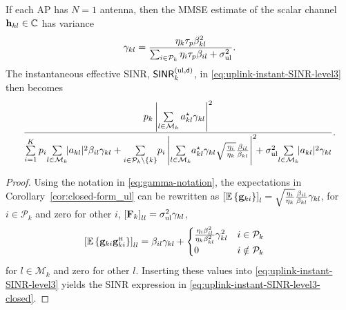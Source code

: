 	\begin{corollary}
	If each AP has $N=1$ antenna, then the MMSE estimate of the scalar channel $\mathbf{h}_{kl} \in \mathbb{C}$ has variance
	\begin{equation} \label{eq:gamma-notation}
	 \gamma_{kl} = \frac{\eta_k \tau_p \beta_{kl}^2 }{ \sum_{i \in \mathcal{P}_k } \eta_i \tau_p \beta_{il} +\sigma^2_{\mathrm{ul}} }.
	 \end{equation}
	The instantaneous effective SINR, $\mathsf{SINR}_{k}^{({\rm ul},\mathsf{d})}$, in \eqref{eq:uplink-instant-SINR-level3} then becomes
		\begin{equation} \label{eq:uplink-instant-SINR-level3-closed}
 \frac{ p_{k} \left| 
\sum\limits_{l \in \mathcal{M}_k} a_{kl}^{\star} \gamma_{kl} \right|^2  }{ 
 \sum\limits_{i=1}^{K} p_{i}  \! \sum\limits_{l \in \mathcal{M}_k}\! \! |a_{kl}|^2 \beta_{il} \gamma_{kl} + \sum\limits_{i \in \mathcal{P}_k \setminus \{ k \}} \! p_i
\left| \sum\limits_{l \in \mathcal{M}_k} \! a_{kl}^{\star} \gamma_{kl} \sqrt{\frac{\eta_i}{\eta_k}} \frac{\beta_{il}}{\beta_{kl}}  \right|^2 \!\!
+ \sigmaUL \!\sum\limits_{l \in \mathcal{M}_k} \!\!  |a_{kl}|^2 \gamma_{kl}
	}.
	\end{equation}
	\end{corollary}
	\begin{proof}
	Using the notation in \eqref{eq:gamma-notation}, the expectations in Corollary~\ref{cor:closed-form_ul} can be rewritten as $\left[\mathbb{E} \left\{\mathbf{g}_{ki}\right\} \right ]_l = \sqrt{\frac{\eta_i}{\eta_k}} \frac{\beta_{il}}{\beta_{kl}} \gamma_{kl}$, for $i\in\mathcal{P}_k$ and zero for other $i$, $\left[ \mathbf{F}_k \right]_{ll}= \sigma^2_{\mathrm{ul}} \gamma_{kl}$,
		\begin{align} 
\left[	\mathbb{E} \left\{\vect{g}_{ki} \vect{g}_{ki}^{\Htran}\right\} \right]_{ll} &= \beta_{il} \gamma_{kl} + \begin{cases}
\frac{\eta_i \beta_{il}^2}{\eta_k \beta_{kl}^2} \gamma_{kl}^2  &    i\in\mathcal{P}_k
	\\
	0 & i\notin\mathcal{P}_k
	\end{cases}
	\end{align}
	for $ l \in \mathcal{M}_k$ and zero for other $l$. Inserting these values into \eqref{eq:uplink-instant-SINR-level3} yields the SINR expression in \eqref{eq:uplink-instant-SINR-level3-closed}.
	\end{proof}
	
